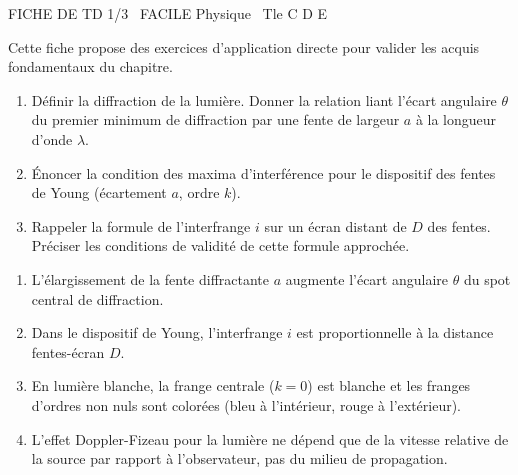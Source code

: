\documentclass[11pt]{article}
\begin{document}
\begin{tcolorbox}[enhanced,colback=popink,colframe=popink,arc=10pt,boxrule=0pt,left=12pt,right=12pt,top=9pt,bottom=9pt]
{\color{white}\popxbold\small FICHE DE TD 1/3 \textbullet\ FACILE \hfill Physique \textbullet\ Tle C D E\par}
\end{tcolorbox}
\vspace{4pt}
Cette fiche propose des exercices d'application directe pour valider les acquis fondamentaux du chapitre.

\begin{exercice}
\begin{enumerate}
    \item Définir la diffraction de la lumière. Donner la relation liant l'écart angulaire $\theta$ du premier minimum de diffraction par une fente de largeur $a$ à la longueur d'onde $\lambda$.
    \item Énoncer la condition des maxima d'interférence pour le dispositif des fentes de Young (écartement $a$, ordre $k$).
    \item Rappeler la formule de l'interfrange $i$ sur un écran distant de $D$ des fentes. Préciser les conditions de validité de cette formule approchée.
\end{enumerate}
\end{exercice}

\begin{exercice}
\begin{enumerate}
    \item L'élargissement de la fente diffractante $a$ augmente l'écart angulaire $\theta$ du spot central de diffraction.
    \item Dans le dispositif de Young, l'interfrange $i$ est proportionnelle à la distance fentes-écran $D$.
    \item En lumière blanche, la frange centrale ($k=0$) est blanche et les franges d'ordres non nuls sont colorées (bleu à l'intérieur, rouge à l'extérieur).
    \item L'effet Doppler-Fizeau pour la lumière ne dépend que de la vitesse relative de la source par rapport à l'observateur, pas du milieu de propagation.
\end{enumerate}
\end{exercice}
\end{document}
